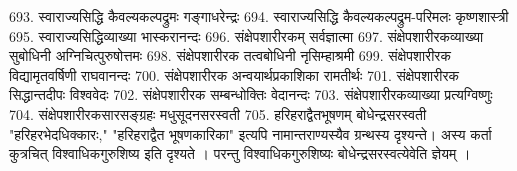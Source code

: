 693. स्वाराज्यसिद्धि कैवल्यकल्पद्रुमः		गङ्गाधरेन्द्रः
694. स्वाराज्यसिद्धि कैवल्यकल्पद्रुम-परिमलः कृष्णशास्त्री
695. स्वाराज्यसिद्धिव्याख्या				भास्करानन्दः
696. संक्षेपशारीरकम् 						सर्वज्ञात्मा
697. संक्षेपशारीरकव्याख्या सुबोधिनी		अग्निचित्पुरुषोत्तमः 
698. संक्षेपशारीरक तत्वबोधिनी			नृसिम्हाश्रमी
699. संक्षेपशारीरक विद्यामृतवर्षिणी 		राघवानन्दः			
700. संक्षेपशारीरक अन्वयार्थप्रकाशिका	रामतीर्थः
701. संक्षेपशारीरक सिद्धान्तदीपः 			विश्ववेदः 
702. संक्षेपशारीरक सम्बन्धोक्तिः			वेदानन्दः
703. संक्षेपशारीरकव्याख्या					प्रत्यग्विष्णुः
704. संक्षेपशारीरकसारसङ्ग्रहः				मधुसूदनसरस्वती 
705. हरिहराद्वैतभूषणम् 						बोधेन्द्रसरस्वती
		"हरिहरभेदधिक्कारः," "हरिहराद्वैत भूषणकारिका" इत्यपि नामान्तराण्यस्यैव ग्रन्थस्य दृश्यन्ते। अस्य कर्ता कुत्रचित् विश्वाधिकगुरुशिष्य इति दृश्यते । परन्तु विश्वाधिकगुरुशिष्यः बोधेन्द्रसरस्वत्येवेति ज्ञेयम् । 
